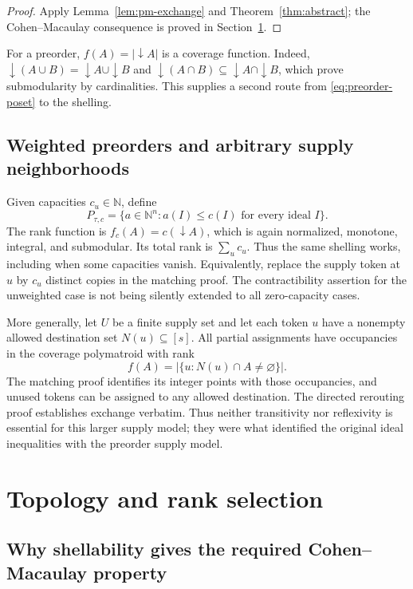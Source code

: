\documentclass[11pt]{article}
\numberwithin{equation}{section}
\theoremstyle{definition}
\theoremstyle{remark}
\newcommand{\N}{\mathbb N}
\begin{document}
\begin{proof}
Apply Lemma~\ref{lem:pm-exchange} and Theorem~\ref{thm:abstract}; the
Cohen--Macaulay consequence is proved in Section~\ref{sec:topology}.
\end{proof}

For a preorder, $f(A)=|\downarrow A|$ is a coverage function. Indeed,
$\downarrow(A\cup B)=\downarrow A\cup\downarrow B$ and
$\downarrow(A\cap B)\subseteq\downarrow A\cap\downarrow B$, which prove
submodularity by cardinalities. This supplies a second route from
\eqref{eq:preorder-poset} to the shelling.

\subsection{Weighted preorders and arbitrary supply neighborhoods}

Given capacities $c_u\in\N$, define
\begin{equation}
 P_{\tau,c}=\{a\in\N^n:a(I)\le c(I)
                         \text{ for every ideal }I\}.
 \label{eq:weighted}
\end{equation}
The rank function is $f_c(A)=c(\downarrow A)$, which is again normalized,
monotone, integral, and submodular. Its total rank is $\sum_u c_u$. Thus the
same shelling works, including when some capacities vanish. Equivalently,
replace the supply token at $u$ by $c_u$ distinct copies in the matching
proof. The contractibility assertion for the unweighted case is not being
silently extended to all zero-capacity cases.

More generally, let $U$ be a finite supply set and let each token $u$ have
a nonempty allowed destination set $N(u)\subseteq[s]$. All partial
assignments have occupancies in the coverage polymatroid with rank
\[
 f(A)=|\{u:N(u)\cap A\ne\varnothing\}|.
\]
The matching proof identifies its integer points with those occupancies,
and unused tokens can be assigned to any allowed destination. The directed
rerouting proof establishes exchange verbatim. Thus neither transitivity nor
reflexivity is essential for this larger supply model; they were what
identified the original ideal inequalities with the preorder supply model.

\section{Topology and rank selection}
\label{sec:topology}

\subsection{Why shellability gives the required Cohen--Macaulay property}
\end{document}

